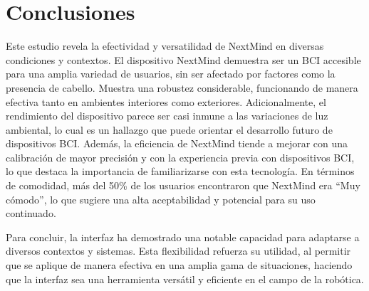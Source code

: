 \section{Conclusiones}

Este estudio revela la efectividad y versatilidad de NextMind en diversas condiciones y contextos. El dispositivo NextMind demuestra ser un BCI accesible para una amplia variedad de usuarios, sin ser afectado por factores como la presencia de cabello. Muestra una robustez considerable, funcionando de manera efectiva tanto en ambientes interiores como exteriores. Adicionalmente, el rendimiento del dispositivo parece ser casi inmune a las variaciones de luz ambiental, lo cual es un hallazgo que puede orientar el desarrollo futuro de dispositivos BCI. Además, la eficiencia de NextMind tiende a mejorar con una calibración de mayor precisión y con la experiencia previa con dispositivos BCI, lo que destaca la importancia de familiarizarse con esta tecnología. En términos de comodidad, más del 50\% de los usuarios encontraron que NextMind era ``Muy cómodo'', lo que sugiere una alta aceptabilidad y potencial para su uso continuado.



Para concluir, la interfaz ha demostrado una notable capacidad para adaptarse a diversos contextos y sistemas. Esta flexibilidad refuerza su utilidad, al permitir que se aplique de manera efectiva en una amplia gama de situaciones, haciendo que la interfaz sea una herramienta versátil y eficiente en el campo de la robótica.

